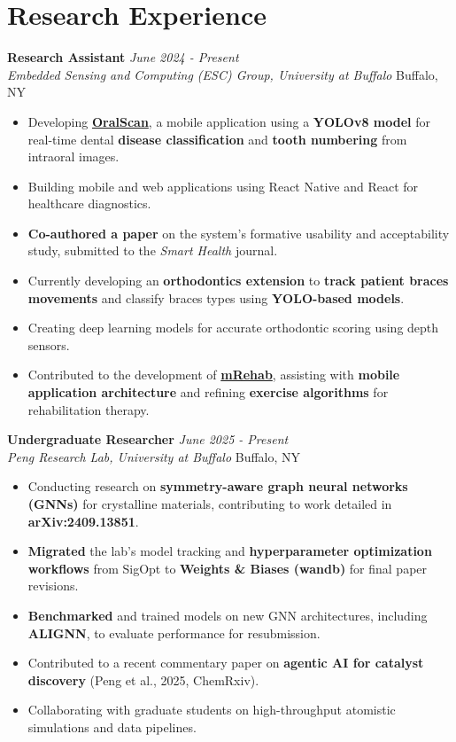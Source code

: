 \documentclass[11pt,a4paper]{article}
\begin{document}
\section*{Research Experience}

\noindent
\textbf{Research Assistant} \hfill \textit{June 2024 - Present} \\
\noindent
\textit{Embedded Sensing and Computing (ESC) Group, University at Buffalo} \hfill Buffalo, NY
\begin{itemize}[nosep]
    \item Developing \textbf{\href{https://oralscan.health/}{OralScan}}, a mobile application using a \textbf{YOLOv8 model} for real-time dental \textbf{disease classification} and \textbf{tooth numbering} from intraoral images.
    \item Building mobile and web applications using React Native and React for healthcare diagnostics.
    \item \textbf{Co-authored a paper} on the system's formative usability and acceptability study, submitted to the \textit{Smart Health} journal.
    \item Currently developing an \textbf{orthodontics extension} to \textbf{track patient braces movements} and classify braces types using \textbf{YOLO-based models}.
    \item Creating deep learning models for accurate orthodontic scoring using depth sensors.
    \item Contributed to the development of \textbf{\href{https://mrehab.agency/}{mRehab}}, assisting with \textbf{mobile application architecture} and refining \textbf{exercise algorithms} for rehabilitation therapy.
\end{itemize}


\noindent
\textbf{Undergraduate Researcher} \hfill \textit{June 2025 - Present} \\
\noindent
\textit{Peng Research Lab, University at Buffalo} \hfill Buffalo, NY
\begin{itemize}[nosep]
    \item Conducting research on \textbf{symmetry-aware graph neural networks (GNNs)} for crystalline materials, contributing to work detailed in \textbf{arXiv:2409.13851}.
    \item \textbf{Migrated} the lab's model tracking and \textbf{hyperparameter optimization workflows} from SigOpt to \textbf{Weights \& Biases (wandb)} for final paper revisions.
    \item \textbf{Benchmarked} and trained models on new GNN architectures, including \textbf{ALIGNN}, to evaluate performance for resubmission.
    \item Contributed to a recent commentary paper on \textbf{agentic AI for catalyst discovery} (Peng et al., 2025, ChemRxiv).
    \item Collaborating with graduate students on high-throughput atomistic simulations and data pipelines.
\end{itemize}
\end{document}
